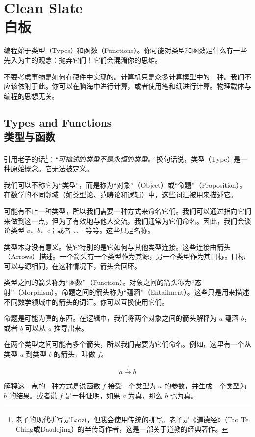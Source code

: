 \documentclass[DaoFP]{subfiles}
\begin{document}
 \chapter{Clean Slate\\白板}

 编程始于类型（Types）和函数（Functions）。你可能对类型和函数是什么有一些先入为主的观念：抛弃它们！它们会混淆你的思维。

 不要考虑事物是如何在硬件中实现的。计算机只是众多计算模型中的一种。我们不应该依附于此。你可以在脑海中进行计算，或者使用笔和纸进行计算。物理载体与编程的思想无关。

 \section{Types and Functions\\类型与函数}

 引用老子的话\footnote{老子的现代拼写是Laozi，但我会使用传统的拼写。老子是《道德经》（Tao Te Ching或Daodejing）的半传奇作者，这是一部关于道教的经典著作。}：\emph{“可描述的类型不是永恒的类型。”} 换句话说，类型（Type）是一种原始概念。它无法被定义。

 我们可以不称它为“类型”，而是称为“对象”（Object）或“命题”（Proposition）。在数学的不同领域（如类型论、范畴论和逻辑）中，这些词汇被用来描述它。

 可能有不止一种类型，所以我们需要一种方式来命名它们。我们可以通过指向它们来做到这一点，但为了有效地与他人交流，我们通常为它们命名。因此，我们会谈论类型 $a$、$b$、$c$；或者 、、 等等。这些只是名称。

 类型本身没有意义。使它特别的是它如何与其他类型连接。这些连接由箭头（Arrows）描述。一个箭头有一个类型作为其源，另一个类型作为其目标。目标可以与源相同，在这种情况下，箭头会回环。

 类型之间的箭头称为“函数”（Function）。对象之间的箭头称为“态射”（Morphism）。命题之间的箭头称为“蕴涵”（Entailment）。这些只是用来描述不同数学领域中的箭头的词汇。你可以互换使用它们。

 命题是可能为真的东西。在逻辑中，我们将两个对象之间的箭头解释为 $a$ 蕴涵 $b$，或者 $b$ 可以从 $a$ 推导出来。

 在两个类型之间可能有多个箭头，所以我们需要为它们命名。例如，这里有一个从类型 $a$ 到类型 $b$ 的箭头，叫做 $f$。

 \[ a \xrightarrow f b \]

 解释这一点的一种方式是说函数 $f$ 接受一个类型为 $a$ 的参数，并生成一个类型为 $b$ 的结果。或者说 $f$ 是一种证明，如果 $a$ 为真，那么 $b$ 也为真。
\end{document}
